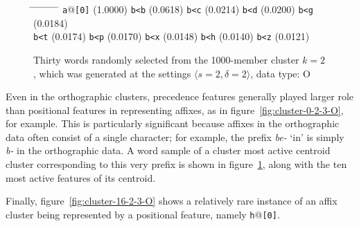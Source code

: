\begin{figure}[t]
\begin{mdframed}
\begin{mdframed}
\begin{small}
\begin{tabbing}
\hspace{6ex} \= \hspace{11ex} \= \hspace{6ex} \= \hspace{11ex} \= \hspace{6ex} \= \hspace{11ex} \= \hspace{6ex} \= \hspace{11ex} \= \hspace{6ex} \= \hspace{11ex} \kill
\texttt{a}@\texttt{[0]} \> (1.0000) \> \texttt{b<b} \> (0.0618) \> \texttt{b<c} \> (0.0214) \> \texttt{b<d} \> (0.0200) \> \texttt{b<g} \> (0.0184) \\
 \texttt{b<t} \> (0.0174) \> \texttt{b<p} \> (0.0170) \> \texttt{b<x} \> (0.0148) \> \texttt{b<h} \> (0.0140) \> \texttt{b<z} \> (0.0121)
\end{tabbing}
\end{small}
\end{mdframed}
\vspace{-6pt}
\caption{Thirty words randomly selected from the 1000-member cluster $k = 2$, which was generated at the settings $\langle{s}=2,\delta=2\rangle$, data type: O}
\label{fig:cluster-2-2-2-O}
\end{mdframed}
\end{figure}

Even in the orthographic clusters, precedence features generally played larger role than positional features in representing affixes, 
as in figure~\ref{fig:cluster-0-2-3-O}, for example. 
This is particularly significant because affixes in the orthographic data often consist of a single character; for example, the prefix \textit{be-} `in' is simply \textit{b-} in the orthographic data. A word sample of a cluster most active centroid cluster corresponding to this very prefix is shown in figure~\ref{fig:cluster-2-2-2-O}, along with the ten most active features of its centroid.

Finally, figure~\ref{fig:cluster-16-2-3-O} shows a relatively rare instance of an affix cluster being represented by a positional feature, namely  \texttt{h}@\texttt{[0]}.
 
